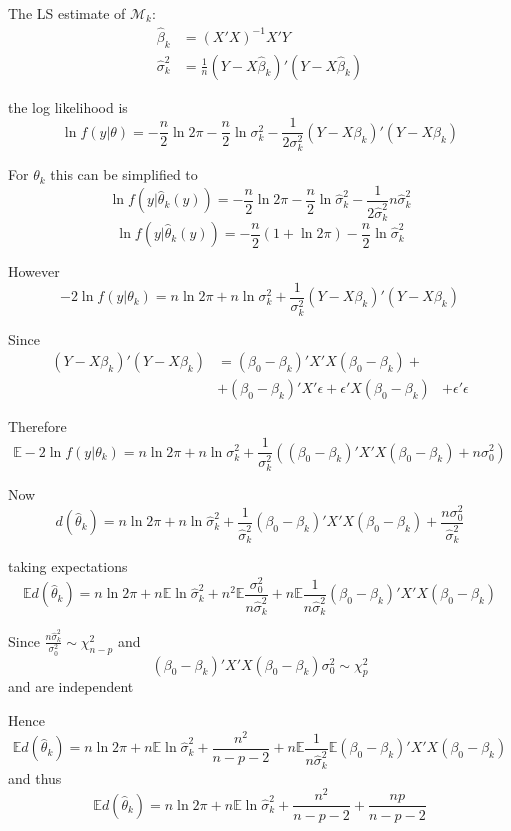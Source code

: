 \documentclass[a4paper]{article}
\newcommand{\brac}[1]{{\left ( #1 \right )}}
\newcommand{\induc}[1]{{\left . #1 \right \vert}}
\newcommand{\Mcal}{\mathcal{M}}
\newcommand{\ex}{\mathbb{E}}
\begin{document}
The LS estimate of $\Mcal_k$:\begin{align*}
	\hat{\beta}_k &= \brac{X'X}^{-1} X'Y\\
	\hat{\sigma}^2_k &= \frac{1}{n}\brac{Y-X\hat{\beta}_k}'\brac{Y-X\hat{\beta}_k}
\end{align*}


the log likelihood is 
\[\ln f\brac{\induc{y}\theta} = -\frac{n}{2} \ln 2\pi -\frac{n}{2}\ln \sigma^2_k - \frac{1}{2\sigma^2_k} \brac{Y-X\beta_k}'\brac{Y-X\beta_k}\]

For $\theta_k$ this can be simplified to 
\[\ln f\brac{\induc{y}\hat{\theta}_k(y)} = -\frac{n}{2} \ln 2\pi -\frac{n}{2}\ln \hat{\sigma}^2_k - \frac{1}{2\hat{\sigma}^2_k} n \hat{\sigma}^2_k \]
\[\ln f\brac{\induc{y}\hat{\theta}_k(y)} = -\frac{n}{2} \brac{ 1 + \ln 2\pi} -\frac{n}{2}\ln \hat{\sigma}^2_k\]

However
\[-2\ln f\brac{\induc{y}\theta_k} = n \ln 2\pi +n\ln \sigma^2_k + \frac{1}{\sigma^2_k} \brac{Y-X\beta_k}'\brac{Y-X\beta_k}\]

Since 
\begin{align*}
	\brac{Y-X\beta_k}'\brac{Y-X\beta_k} &= \brac{\beta_0-\beta_k}'X'X\brac{\beta_0-\beta_k} + \\
		& + \brac{\beta_0 - \beta_k}'X'\epsilon + \epsilon'X\brac{\beta_0 - \beta_k}
		& + \epsilon'\epsilon
\end{align*}

Therefore 
\[\ex-2\ln f\brac{\induc{y}\theta_k} = n \ln 2\pi + n\ln \sigma^2_k + \frac{1}{\sigma^2_k} \brac{ \brac{\beta_0-\beta_k}'X'X\brac{\beta_0-\beta_k} + n\sigma_0^2 }\]

Now 
\[d\brac{\hat{\theta}_k} = n \ln 2\pi + n\ln \hat{\sigma}^2_k + \frac{1}{\hat{\sigma}^2_k}\brac{\beta_0-\beta_k}'X'X\brac{\beta_0-\beta_k} + \frac{n\sigma_0^2}{\hat{\sigma}^2_k}\]

taking expectations
\[\ex d\brac{\hat{\theta}_k} = n \ln 2\pi + n\ex \ln \hat{\sigma}^2_k + n^2\ex \frac{\sigma_0^2}{n\hat{\sigma}^2_k} + n \ex \frac{1}{n\hat{\sigma}^2_k}\brac{\beta_0-\beta_k}'X'X\brac{\beta_0-\beta_k}\]

Since $\frac{n\hat{\sigma}^2_k}{\sigma_0^2} \sim \chi^2_{n-p}$ and 
\[\brac{\beta_0-\beta_k}'X'X\brac{\beta_0-\beta_k}{\sigma_0^2} \sim \chi^2_p\]
and are independent

Hence
\[\ex d\brac{\hat{\theta}_k} = n \ln 2\pi + n\ex \ln \hat{\sigma}^2_k + \frac{n^2}{n-p-2} + n \ex \frac{1}{n\hat{\sigma}^2_k} \ex \brac{\beta_0-\beta_k}'X'X\brac{\beta_0-\beta_k}\]
and thus 
\[\ex d\brac{\hat{\theta}_k} = n \ln 2\pi + n\ex \ln \hat{\sigma}^2_k + \frac{n^2}{n-p-2} + \frac{n p}{n-p-2} \]
\end{document}
